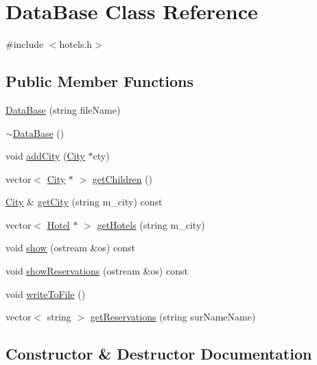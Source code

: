 \hypertarget{class_data_base}{}\section{Data\+Base Class Reference}
\label{class_data_base}


{\ttfamily \#include $<$hotels.\+h$>$}

\subsection*{Public Member Functions}
\begin{DoxyCompactItemize}
\item 
\hyperlink{class_data_base_ac9231375bb821d55201b26f9049c8661}{Data\+Base} (string file\+Name)
\item 
\hyperlink{class_data_base_a9d4629e705ccaa4897e9650222a2a648}{$\sim$\+Data\+Base} ()
\item 
void \hyperlink{class_data_base_a090b459850b95afaaa23cba4339508e3}{add\+City} (\hyperlink{class_city}{City} $\ast$cty)
\item 
vector$<$ \hyperlink{class_city}{City} $\ast$ $>$ \hyperlink{class_data_base_af0444cd53bc289472c9e2f09a83afaf4}{get\+Children} ()
\item 
\hyperlink{class_city}{City} \& \hyperlink{class_data_base_acf702c18049dec5367c04249c8b431f7}{get\+City} (string m\+\_\+city) const
\item 
vector$<$ \hyperlink{class_hotel}{Hotel} $\ast$ $>$ \hyperlink{class_data_base_a0a4e75be22c35f5da860ce89cf264018}{get\+Hotels} (string m\+\_\+city)
\item 
void \hyperlink{class_data_base_a47afe882e3b264b43e8cb4bf3f894a68}{show} (ostream \&os) const
\item 
void \hyperlink{class_data_base_a8ea4492457e052838b3b9d41c00d786d}{show\+Reservations} (ostream \&os) const
\item 
void \hyperlink{class_data_base_ae099589c13d77b31a311fc0469250288}{write\+To\+File} ()
\item 
vector$<$ string $>$ \hyperlink{class_data_base_a8e5b464d772e7cdac7c10b5548fef1b2}{get\+Reservations} (string sur\+Name\+Name)
\end{DoxyCompactItemize}


\subsection{Constructor \& Destructor Documentation}
\mbox{\label{class_data_base_ac9231375bb821d55201b26f9049c8661}} 
